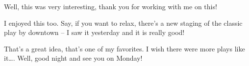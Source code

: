 \heroSTUDENT{} Well, this was very interesting, thank you for working with me
on this!

\heroADVISOR{} I enjoyed this too. Say, if you want to relax, there's a new
staging of the classic play by \citet{fischer2010play} downtown -- I saw
it yesterday and it is really good!

\heroSTUDENT{} That's a great idea, that's one of my favorites. I wish there
were more plays like it\ldots{}. Well, good night and see you on Monday!
